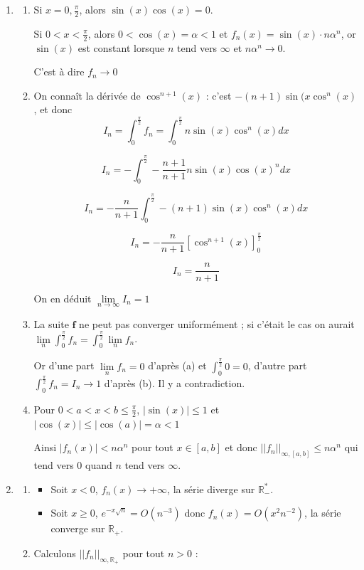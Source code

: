 \documentclass[]{article}
\begin{document}
\begin{enumerate}

\item
\begin{enumerate}
	\item Si $x = 0, \frac{\pi}{2}$, alors $\sin(x)\cos(x) = 0$.
	
	Si $0 < x < \frac{\pi}{2}$, alors $0 < \cos(x) = \alpha < 1$ et $f_n(x)=\sin(x) \cdot n \alpha^n$, or $\sin(x)$ est constant lorsque $n$ tend vers $\infty$ et $n \alpha^n \to 0$.
	
	C'est à dire $f_n \to 0$
	
	\item On connaît la dérivée de $\cos^{n+1}(x)$ : c'est $-(n+1)\sin(x\cos^n(x)$, et donc $$I_n = \int_{0}^{\frac{\pi}{2}}f_n = \int_{0}^{\frac{\pi}{2}}n \sin(x)\cos^n(x)dx$$
	
	$$I_n = - \int_{0}^{\frac{\pi}{2}}-\frac{n+1}{n+1} n \sin(x) \cos(x)^ndx$$
	
	$$I_n = -\frac{n}{n+1}\int_{0}^{\frac{\pi}{2}} - (n+1) \sin(x)\cos^n(x)dx$$
	
	$$I_n = - \frac{n}{n+1}\left[\cos^{n+1}(x)\right]^{\frac{\pi}{2}}_0$$
	
	$$I_n=\frac{n}{n+1}$$
	
	On en déduit $\lim\limits_{n \to \infty} I_n = 1$
	
	\item La suite $\textbf{f}$ ne peut pas converger uniformément ; si c'était le cas on aurait $\displaystyle \lim\limits_{n} \int_{0}^{\frac{\pi}{2}}f_n = \int_{0}^{\frac{\pi}{2}} \lim\limits_{n}f_n$.
	
	Or d'une part $\displaystyle \lim\limits_{n} f_n = 0$ d'après (a) et $\displaystyle \int_{0}^{\frac{\pi}{2}} 0 = 0$, d'autre part $\displaystyle \int_{0}^{\frac{\pi}{2}} f_n = I_n \to 1$ d'après (b). Il y a contradiction.
	
	\item Pour $0 < a < x < b \leqslant \frac{\pi}{2}$, $|\sin(x)| \leqslant 1$ et $|\cos(x)| \leqslant |\cos(a)| = \alpha < 1$
	
	Ainsi $|f_n(x)| < n \alpha^n$ pour tout $x \in [a, b]$ et donc $||f_n||_{\infty, [a,b]} \leqslant n \alpha^n$ qui tend vers 0 quand $n$ tend vers $\infty$.
\end{enumerate}

\item 
\begin{enumerate}
	\item
	\begin{itemize}
		\item Soit $x < 0$, $f_n(x) \to +\infty$, la série diverge sur $\mathbb{R}^*_-$.
		\item Soit $x \geqslant 0$, $e^{-x \sqrt{n}} = O(n^{-3})$ donc $f_n(x)=O(x^2 n^{-2})$, la série converge sur $\mathbb{R}_+$.
	\end{itemize}
	\item Calculons $||f_n||_{\infty, \mathbb{R_+}}$ pour tout $n > 0$ :
	

\end{enumerate}
\end{enumerate}
\end{document}
